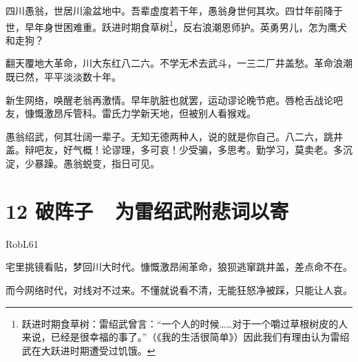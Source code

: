 \documentclass[UTF8,12pt,oneside]{ctexbook}
\begin{document}
        四川愚翁，世居川渝盆地中。吾辈虚度若干年，愚翁身世何其坎。四廿年前降于世，早年身世困难重。跃进时期食草树\footnote{跃进时期食草树：雷绍武曾言：“一个人的时候……对于一个嚼过草根树皮的人来说，已经是很幸福的事了。”（《我的生活很简单》）因此我们有理由认为雷绍武在大跃进时期遭受过饥饿。}，反右浪潮恩师护。英勇男儿，怎为鹰犬和走狗？
        
        翻天覆地大革命，川大东红八二六。不学无术去武斗，一三二厂井盖愁。革命浪潮既已然，平平淡淡数十年。
        
        新生网络，唤醒老翁再激情。早年肮脏也就罢，运动谬论晚节疤。唇枪舌战论吧友，慷慨激昂斥管科。雷氏力学新天地，但被别人看猴戏。
        
        愚翁绍武，何其壮阔一辈子。无知无德两种人，说的就是你自己。八二六，跳井盖。辩吧友，好气概！论谬理，多可哀！少受骗，多思考。勤学习，莫卖老。多沉淀，少暴躁。愚翁蜕变，指日可见。
        ~\\
        
    \section{12 破阵子\ \ 为雷绍武附悲词以寄}
    \begin{center}
        RobL61
        
    \end{center}
       
        宅里挑镜看贴，梦回川大时代。慷慨激昂闹革命，狼狈逃窜跳井盖，差点命不在。
        
        而今网络时代，对线对不过来。不懂就说看不清，无能狂怒净被踩，只能让人哀。
        
    \newpage
\end{document}

